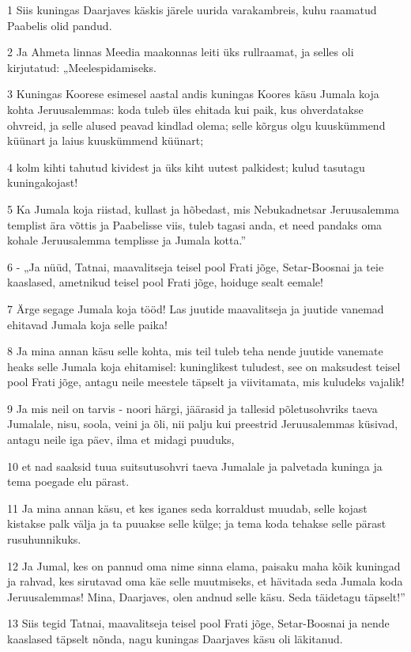 \par 1 Siis kuningas Daarjaves käskis järele uurida varakambreis, kuhu raamatud Paabelis olid pandud.
\par 2 Ja Ahmeta linnas Meedia maakonnas leiti üks rullraamat, ja selles oli kirjutatud: „Meelespidamiseks.
\par 3 Kuningas Koorese esimesel aastal andis kuningas Koores käsu Jumala koja kohta Jeruusalemmas: koda tuleb üles ehitada kui paik, kus ohverdatakse ohvreid, ja selle alused peavad kindlad olema; selle kõrgus olgu kuuskümmend küünart ja laius kuuskümmend küünart;
\par 4 kolm kihti tahutud kividest ja üks kiht uutest palkidest; kulud tasutagu kuningakojast!
\par 5 Ka Jumala koja riistad, kullast ja hõbedast, mis Nebukadnetsar Jeruusalemma templist ära võttis ja Paabelisse viis, tuleb tagasi anda, et need pandaks oma kohale Jeruusalemma templisse ja Jumala kotta.”
\par 6 - „Ja nüüd, Tatnai, maavalitseja teisel pool Frati jõge, Setar-Boosnai ja teie kaaslased, ametnikud teisel pool Frati jõge, hoiduge sealt eemale!
\par 7 Ärge segage Jumala koja tööd! Las juutide maavalitseja ja juutide vanemad ehitavad Jumala koja selle paika!
\par 8 Ja mina annan käsu selle kohta, mis teil tuleb teha nende juutide vanemate heaks selle Jumala koja ehitamisel: kuninglikest tuludest, see on maksudest teisel pool Frati jõge, antagu neile meestele täpselt ja viivitamata, mis kuludeks vajalik!
\par 9 Ja mis neil on tarvis - noori härgi, jäärasid ja tallesid põletusohvriks taeva Jumalale, nisu, soola, veini ja õli, nii palju kui preestrid Jeruusalemmas küsivad, antagu neile iga päev, ilma et midagi puuduks,
\par 10 et nad saaksid tuua suitsutusohvri taeva Jumalale ja palvetada kuninga ja tema poegade elu pärast.
\par 11 Ja mina annan käsu, et kes iganes seda korraldust muudab, selle kojast kistakse palk välja ja ta puuakse selle külge; ja tema koda tehakse selle pärast rusuhunnikuks.
\par 12 Ja Jumal, kes on pannud oma nime sinna elama, paisaku maha kõik kuningad ja rahvad, kes sirutavad oma käe selle muutmiseks, et hävitada seda Jumala koda Jeruusalemmas! Mina, Daarjaves, olen andnud selle käsu. Seda täidetagu täpselt!”
\par 13 Siis tegid Tatnai, maavalitseja teisel pool Frati jõge, Setar-Boosnai ja nende kaaslased täpselt nõnda, nagu kuningas Daarjaves käsu oli läkitanud.

